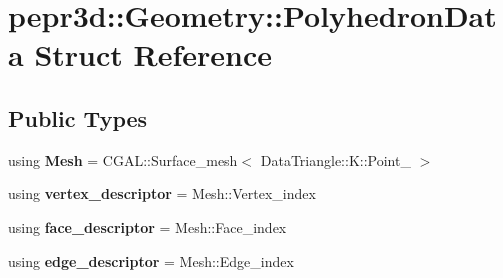 \hypertarget{structpepr3d_1_1_geometry_1_1_polyhedron_data}{}\section{pepr3d\+::Geometry\+::Polyhedron\+Data Struct Reference}
\label{structpepr3d_1_1_geometry_1_1_polyhedron_data}
\subsection*{Public Types}
\begin{DoxyCompactItemize}
\item 
\mbox{\label{structpepr3d_1_1_geometry_1_1_polyhedron_data_ac9456ec155e3448f149854a0ccf42423}} 
using {\bfseries Mesh} = C\+G\+A\+L\+::\+Surface\+\_\+mesh$<$ Data\+Triangle\+::\+K\+::\+Point\+\_ $>$
\item 
\mbox{\label{structpepr3d_1_1_geometry_1_1_polyhedron_data_a332607b6de7afe616d6be95555906136}} 
using {\bfseries vertex\+\_\+descriptor} = Mesh\+::\+Vertex\+\_\+index
\item 
\mbox{\label{structpepr3d_1_1_geometry_1_1_polyhedron_data_a787ae091f4045e28a069b5e43954fe9b}} 
using {\bfseries face\+\_\+descriptor} = Mesh\+::\+Face\+\_\+index
\item 
\mbox{\label{structpepr3d_1_1_geometry_1_1_polyhedron_data_a2deaa69a734496b6de287059583f1020}} 
using {\bfseries edge\+\_\+descriptor} = Mesh\+::\+Edge\+\_\+index
\end{DoxyCompactItemize}
